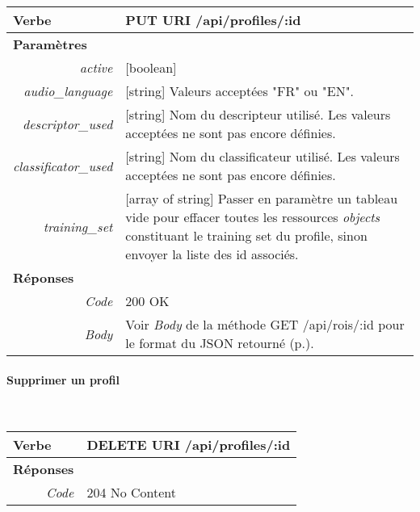 \begin{appendices}
\begin{absolutelynopagebreak}
\begin{tabular}{@{}p{2cm}p{11.5cm}@{}}
    \toprule
    \textbf{Verbe}                        & PUT \hspace{2.5cm} \textbf{URI} \hspace{0.25cm} /api/profiles/:id   \\ \midrule
    \textbf{Paramètres}                   &        \\
    \multicolumn{1}{r}{\textit{active}}  & [boolean] \\
    \multicolumn{1}{r}{\textit{audio\_language}}  & [string] Valeurs acceptées "FR" ou "EN". \\
    \multicolumn{1}{r}{\textit{descriptor\_used}}  & [string] Nom du descripteur utilisé.
    Les valeurs acceptées ne sont pas encore définies.\\
    \multicolumn{1}{r}{\textit{classificator\_used}}  & [string] Nom du classificateur utilisé.
    Les valeurs acceptées ne sont pas encore définies.\\
    \multicolumn{1}{r}{\textit{training\_set}}  & [array of string] Passer en paramètre un tableau vide pour effacer toutes les ressources \emph{objects} constituant le training set du profile, sinon envoyer la liste des id associés. \\
    \midrule
    \textbf{Réponses}                     &        \\
    \multicolumn{1}{r}{\textit{Code}}   & 200 OK \\
    \multicolumn{1}{r}{\textit{Body}}   & Voir \emph{Body} de la méthode GET /api/rois/:id pour le format du JSON retourné (p.\pageref{jsonHalProfiles}).
    \\ \bottomrule
\end{tabular}
\end{absolutelynopagebreak}

\begin{absolutelynopagebreak}
\paragraph{Supprimer un profil}
~

\begin{tabular}{@{}p{2cm}p{11.5cm}@{}}
    \toprule
    \textbf{Verbe}                        & DELETE \hspace{2.5cm} \textbf{URI} \hspace{0.25cm} /api/profiles/:id   \\ \midrule
    \textbf{Réponses}                     &        \\
    \multicolumn{1}{r}{\textit{Code}}   & 204 No Content \\ \bottomrule
\end{tabular}
\end{absolutelynopagebreak}


\end{appendices}

